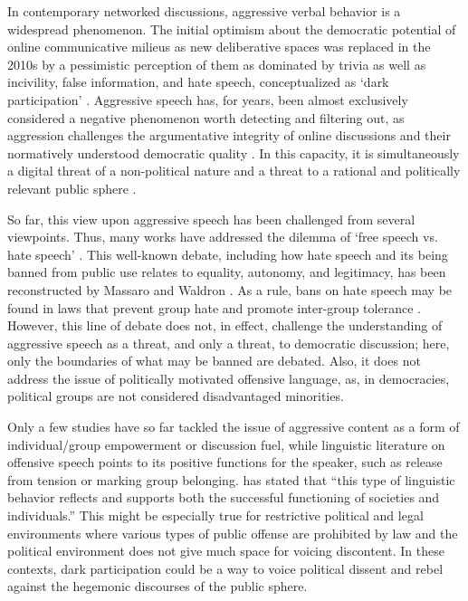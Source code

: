 In contemporary networked discussions, aggressive verbal behavior is a widespread phenomenon. The initial optimism about the democratic potential of online communicative milieus as new deliberative spaces \cite{DiakopoulosNaaman} was replaced in the 2010s by a pessimistic perception of them as dominated by trivia \cite{Fuchs} as well as incivility, false information, and hate speech, conceptualized as ‘dark participation’ \cite{Quandt}. Aggressive speech has, for years, been almost exclusively considered a negative phenomenon worth detecting and filtering out, as aggression challenges the argumentative integrity of online discussions \cite{VollhardtCoutinStaub} and their normatively understood democratic quality \cite{Cortese}. In this capacity, it is simultaneously a digital threat of a non-political nature \cite{SalterKuehnBerentsonShaw} and a threat to a rational and politically relevant public sphere \cite{MillerVaccari,Pfetsch}.

So far, this view upon aggressive speech has been challenged from several viewpoints. Thus, many works have addressed the dilemma of ‘free speech vs. hate speech’ \cite{HareWeinstein,Howard,Weinstein}. This well-known debate, including how hate speech and its being banned from public use relates to equality, autonomy, and legitimacy, has been reconstructed by Massaro \cite{Massaro} and Waldron \cite{Waldron}. As a rule, bans on hate speech may be found in laws that prevent group hate and promote inter-group tolerance \cite[p.~8]{Waldron}. However, this line of debate does not, in effect, challenge the understanding of aggressive speech as a threat, and only a threat, to democratic discussion; here, only the boundaries of what may be banned are debated. Also, it does not address the issue of politically motivated offensive language, as, in democracies, political groups are not considered disadvantaged minorities.

Only a few studies have so far tackled the issue of aggressive content as a form of individual/group empowerment or discussion fuel, while linguistic literature on offensive speech points to its positive functions for the speaker, such as release from tension or marking group belonging. \cite[p.~61]{Burns} has stated that “this type of linguistic behavior reflects and supports both the successful functioning of societies and individuals.” This might be especially true for restrictive political and legal environments where various types of public offense are prohibited by law and the political environment does not give much space for voicing discontent. In these contexts, dark participation could be a way to voice political dissent and rebel against the hegemonic discourses of the public sphere.

